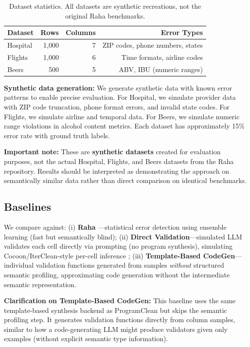 \documentclass{article}
\begin{document}
\begin{table}[h]
\caption{Dataset statistics. All datasets are synthetic recreations, not the original Raha benchmarks.}
\label{tab:datasets}
\centering
\small
\begin{tabular}{lrrr}
\toprule
Dataset & Rows & Columns & Error Types \\
\midrule
Hospital & 1,000 & 7 & ZIP codes, phone numbers, states \\
Flights & 1,000 & 6 & Time formats, airline codes \\
Beers & 500 & 5 & ABV, IBU (numeric ranges) \\
\bottomrule
\end{tabular}
\end{table}

\textbf{Synthetic data generation:} We generate synthetic data with known error patterns to enable precise evaluation. For Hospital, we simulate provider data with ZIP code truncation, phone format errors, and invalid state codes. For Flights, we simulate airline and temporal data. For Beers, we simulate numeric range violations in alcohol content metrics. Each dataset has approximately 15\% error rate with ground truth labels.

\textbf{Important note:} These are \textbf{synthetic datasets} created for evaluation purposes, not the actual Hospital, Flights, and Beers datasets from the Raha repository. Results should be interpreted as demonstrating the approach on semantically similar data rather than direct comparison on identical benchmarks.

\subsection{Baselines}

We compare against: (i) \textbf{Raha} \citep{mahdavi2019raha}---statistical error detection using ensemble learning (fast but semantically blind); (ii) \textbf{Direct Validation}---simulated LLM validates each cell directly via prompting (no program synthesis), simulating Cocoon/IterClean-style per-cell inference \citep{ni2024iterclean, huang2024cocoon}; (iii) \textbf{Template-Based CodeGen}---individual validation functions generated from samples \textit{without} structured semantic profiling, approximating code generation without the intermediate semantic representation.

\textbf{Clarification on Template-Based CodeGen:} This baseline uses the same template-based synthesis backend as ProgramClean but skips the semantic profiling step. It generates validation functions directly from column samples, similar to how a code-generating LLM might produce validators given only examples (without explicit semantic type information).
\end{document}
